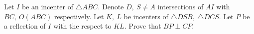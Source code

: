 Let $I$ be an incenter of $\triangle ABC$. Denote $D, \ S \neq A$ intersections of $AI$ with $BC, \ O(ABC)$ respectively. Let $K, \ L$ be incenters of $\triangle DSB, \ \triangle DCS$. Let $P$ be a reflection of $I$ with the respect to $KL$. Prove that $BP \perp CP$.